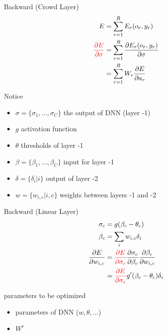 \documentclass{beamer}
\begin{document}
\begin{frame}{Backward (Crowd Layer)}
    \begin{align*}
        E
        &= \sum_{r=1}^R E_r(o_r,y_r)\\
        \textcolor{red}{\frac{\partial E}{\partial \sigma}}
        &= \sum_{r=1}^R \frac{\partial E_r(o_r,y_r)}{\partial \sigma} \\
        &= \sum_{r=1}^R W_r \frac{\partial E}{\partial a_r}
    \end{align*}
\end{frame}

\begin{frame}{Notice}
    \begin{itemize}
        \item $\sigma = \{\sigma_1, ..., \sigma_C\}$ the output of DNN (layer -1)
        \item $g$ activation function
        \item $\theta$ thresholds of layer -1
        \item $\beta = \{\beta_1, ..., \beta_C\}$ input for layer -1
        \item $\delta = \{\delta_i | i\}$ output of layer -2
        \item $w = \{w_{i,c} | i,c\}$ weights between layers -1 and -2
    \end{itemize}
\end{frame}

\begin{frame}{Backward (Linear Layer)}
    \begin{align*}
        \sigma_c &= g(\beta_c-\theta_c) \\
        \beta_c &= \sum_i w_{i,c}\delta_i \\
        \frac{\partial E}{\partial w_{i,c}}
        &= \textcolor{red}{\frac{\partial E}{\partial\sigma_c}}\frac{\partial\sigma_c}{\partial\beta_c}\frac{\partial\beta_c}{\partial w_{i,c}} \\
        &= \textcolor{red}{\frac{\partial E}{\partial\sigma_c}}g'(\beta_c-\theta_c)\delta_i
    \end{align*}
\end{frame}

\begin{frame}{parameters to be optimized}
    \begin{itemize}
        \item parameters of DNN ($w, \theta, ...$)
        \item $W^r$
    \end{itemize}
\end{frame}
\end{document}
